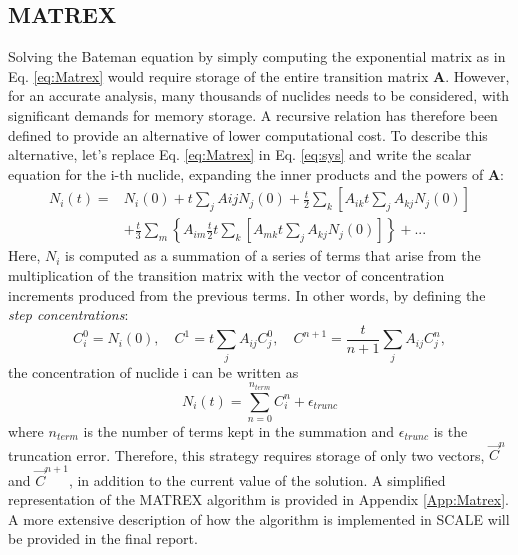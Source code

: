 \documentclass[a4paper,titlepage]{article}
\newcommand{\cvec}{\ensuremath{\vec{C}}}
\begin{document}
\subsection{MATREX}
Solving the Bateman equation by simply computing the exponential matrix as in Eq. \ref{eq:Matrex} would require storage of the entire transition matrix $\textbf{A}$. However, for an accurate analysis, many thousands of nuclides needs to be considered, with significant demands for memory storage. A recursive relation has therefore been defined to provide an alternative of lower computational cost. To describe this alternative, let's replace Eq. \ref{eq:Matrex} in Eq. \ref{eq:sys} and write the scalar equation for the i-th nuclide, expanding the inner products and the powers of \textbf{A}:
\begin{equation}
\begin{split}
    N_i(t)=&N_i(0)+t\sum_j AijN_j(0)+\frac{t}{2}\sum_k\left[A_{ik}t\sum_jA_{kj}N_j(0)\right]\\&+\frac{t}{3}\sum_m\left\{A_{im}\frac{t}{2}t\sum_k\left[A_{mk}t\sum_jA_{kj}N_j(0)\right]\right\}+...
\end{split}
\end{equation}
Here, $N_i$ is computed as a summation of a series of terms that arise from the multiplication of the transition matrix with the vector of concentration increments produced from the previous terms. In other words, by defining the \textit{step concentrations}:
\begin{equation}
    C^0_i=N_i(0), \quad C^1=t\sum_jA_{ij}C^0_j, \quad C^{n+1}=\frac{t}{n+1}\sum_jA_{ij}C_j^n, 
\end{equation}
the concentration of nuclide i can be written as
\begin{equation}
    N_i(t)=\sum_{n=0}^{n_{term}}C^n_i + \epsilon_{trunc}
\end{equation}
where $n_{term}$ is the number of terms kept in the summation and $\epsilon_{trunc}$ is the truncation error. Therefore, this strategy requires storage of only two vectors, $\cvec^n$ and $\cvec^{n+1}$, in addition to the current value of the solution.
A simplified representation of the MATREX algorithm is provided in Appendix \ref{App:Matrex}. A more extensive description of how the algorithm is implemented in SCALE will be provided in the final report.
\end{document}
